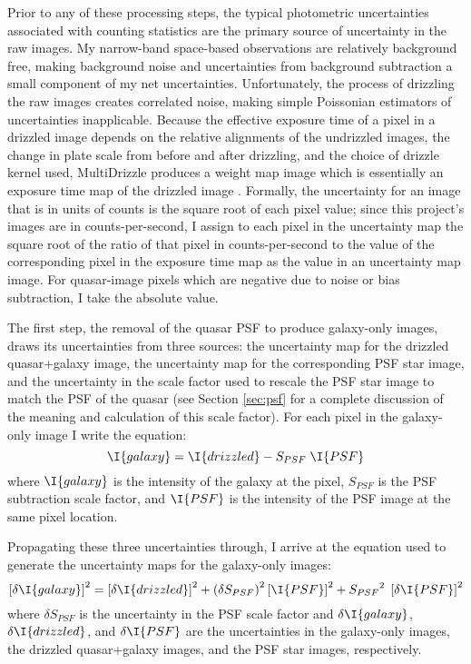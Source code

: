 Prior to any of these processing steps, the typical photometric uncertainties associated with counting statistics are the primary source of uncertainty in the raw images.  My narrow-band space-based observations are relatively background free, making background noise and uncertainties from background subtraction a small component of my net uncertainties.  Unfortunately, the process of drizzling the raw images creates correlated noise, making simple Poissonian estimators of uncertainties inapplicable.  Because the effective exposure time of a pixel in a drizzled image depends on the relative alignments of the undrizzled images, the change in plate scale from before and after drizzling, and the choice of drizzle kernel used, MultiDrizzle produces a weight map image which is essentially an exposure time map of the drizzled image \citep{FruchterDrizzle,KoekemoerMultidrizzle}. Formally, the uncertainty for an image that is in units of counts is the square root of each pixel value; since this project's images are in counts-per-second, I assign to each pixel in the uncertainty map the square root of the ratio of that pixel in counts-per-second to the value of the corresponding pixel in the exposure time map as the value in an uncertainty map image. For quasar-image pixels which are negative due to noise or bias subtraction, I take the absolute value.

The first step, the removal of the quasar PSF to produce galaxy-only images, draws its uncertainties from three sources: the uncertainty map for the drizzled quasar+galaxy image, the uncertainty map for the corresponding PSF star image, and the uncertainty in the scale factor used to rescale the PSF star image to match the PSF of the quasar (see Section \ref{sec:psf} for a complete discussion of the meaning and calculation of this scale factor). For each pixel in the galaxy-only image I write the equation:
\begin{equation}
 \I{galaxy} = \I{drizzled} - S_{PSF}\;\I{PSF}
\end{equation}
where $\I{galaxy}$ is the intensity of the galaxy at the pixel, $S_{PSF}$ is the PSF subtraction scale factor, and $\I{PSF}$ is the intensity of the PSF image at the same pixel location.%

Propagating these three uncertainties through, I arrive at the equation used to generate the uncertainty maps for the galaxy-only images:
\begin{equation}
\left[\delta\I{galaxy}\right]^2 = \left[\delta\I{drizzled}\right]^2 + \left(\delta S_{PSF}\right)^2\left[\I{PSF}\right]^2  + {S_{PSF}}^2\;\left[\delta\I{PSF}\right]^2
\end{equation}
where $\delta S_{PSF}$ is the uncertainty in the PSF scale factor and $\delta\I{galaxy}$, $\delta\I{drizzled}$, and $\delta\I{PSF}$ are the uncertainties in the galaxy-only images, the drizzled quasar+galaxy images, and the PSF star images, respectively.

